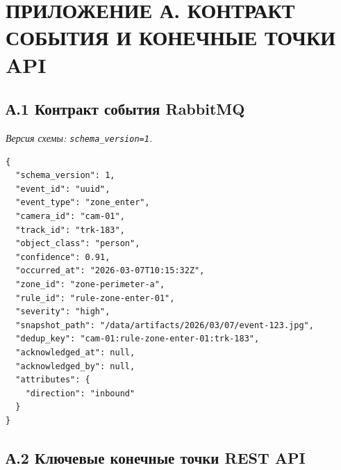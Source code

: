 \chapter*{ПРИЛОЖЕНИЕ А. КОНТРАКТ СОБЫТИЯ И КОНЕЧНЫЕ ТОЧКИ API}
{}

\section*{А.1 Контракт события RabbitMQ}
{}

\textit{Версия схемы: \texttt{schema\_version=1}.}

\begin{verbatim}
{
  "schema_version": 1,
  "event_id": "uuid",
  "event_type": "zone_enter",
  "camera_id": "cam-01",
  "track_id": "trk-183",
  "object_class": "person",
  "confidence": 0.91,
  "occurred_at": "2026-03-07T10:15:32Z",
  "zone_id": "zone-perimeter-a",
  "rule_id": "rule-zone-enter-01",
  "severity": "high",
  "snapshot_path": "/data/artifacts/2026/03/07/event-123.jpg",
  "dedup_key": "cam-01:rule-zone-enter-01:trk-183",
  "acknowledged_at": null,
  "acknowledged_by": null,
  "attributes": {
    "direction": "inbound"
  }
}
\end{verbatim}

\section*{А.2 Ключевые конечные точки REST API}
{}

